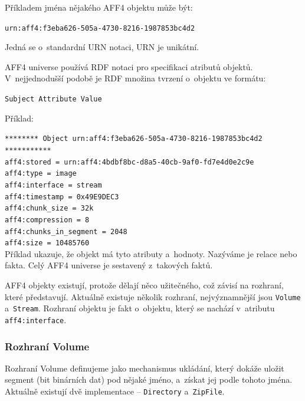 \noindent Příkladem jména nějakého AFF4 objektu může být:

\texttt{urn:aff4:f3eba626-505a-4730-8216-1987853bc4d2}

\noindent Jedná se o~standardní URN notaci, URN je unikátní.

\vspace{0.5cm}

\noindent AFF4 universe používá RDF notaci pro specifikaci atributů objektů. V~nejjednodušší podobě je RDF množina tvrzení o~objektu ve formátu:

\texttt{Subject   Attribute   Value}

\vspace{0.5cm}

\noindent Příklad:

\noindent \texttt{******** Object urn:aff4:f3eba626-505a-4730-8216-1987853bc4d2 ***********}\\
\texttt{aff4:stored = urn:aff4:4bdbf8bc-d8a5-40cb-9af0-fd7e4d0e2c9e}\\
\texttt{aff4:type = image}\\
\texttt{aff4:interface = stream}\\
\texttt{aff4:timestamp = 0x49E9DEC3}\\
\texttt{aff4:chunk\_size = 32k}\\
\texttt{aff4:compression = 8}\\
\texttt{aff4:chunks\_in\_segment = 2048}\\
\texttt{aff4:size = 10485760}\\

\noindent Příklad ukazuje, že objekt má tyto atributy a~hodnoty. Nazýváme je relace nebo fakta. Celý AFF4 universe je sestavený z~takových faktů.

\noindent AFF4 objekty existují, protože dělají něco užitečného, což závisí na rozhraní, které představují. Aktuálně existuje několik rozhraní, nejvýznamnější jsou \texttt{Volume} a~\texttt{Stream}. Rozhraní objektu je fakt o~objektu, který se nachází v~atributu \texttt{aff4:interface}.

\subsubsection{Rozhraní Volume}
Rozhraní Volume definujeme jako mechanismus ukládání, který dokáže uložit segment (bit binárních dat) pod nějaké jméno, a~získat jej podle tohoto jména. Aktuálně existují dvě implementace -- \texttt{Directory} a~\texttt{ZipFile}.


